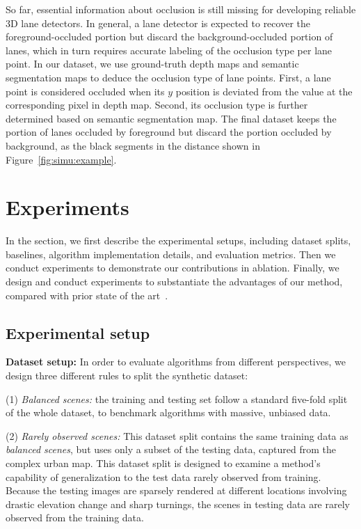\documentclass[10pt,twocolumn,letterpaper]{article}
\begin{document}
So far, essential information about occlusion is still missing for developing reliable 3D lane detectors. In general, a lane detector is expected to recover the foreground-occluded portion but discard the background-occluded portion of lanes, which in turn requires accurate labeling of the occlusion type per lane point. In our dataset, we use ground-truth depth maps and semantic segmentation maps to deduce the occlusion type of lane points. First, a lane point is considered occluded when its $y$ position is deviated from the value at the corresponding pixel in depth map. Second, its occlusion type is further determined based on semantic segmentation map. The final dataset keeps the portion of lanes occluded by foreground but discard the portion occluded by background, as the black segments in the distance shown in Figure~\ref{fig:simu:example}.




\section{Experiments}
\label{sec:exp}

In the section, we first describe the experimental setups, including dataset splits, baselines, algorithm implementation details, and evaluation metrics. Then we conduct experiments to demonstrate our contributions in ablation. Finally, we design and conduct experiments to substantiate the advantages of our method, compared with prior state of the art~\cite{Garnett:etal:ICCV2019}.

  \subsection{Experimental setup}
{\bf Dataset setup:} In order to evaluate algorithms from different perspectives, we design three different rules to split the synthetic dataset:

(1) {\it Balanced scenes:} the training and testing set follow a standard five-fold split of the whole dataset, to benchmark  algorithms with massive, unbiased data.

(2) {\it Rarely observed scenes:} This dataset split contains the same training data as {\it balanced scenes}, but uses only a subset of the testing data, captured from the complex urban map. This dataset split is designed to examine a method's capability of generalization to the test data rarely observed from training. Because the testing images are sparsely rendered at different locations involving drastic elevation change and sharp turnings, the scenes in testing data are rarely observed from the training data.
\end{document}
